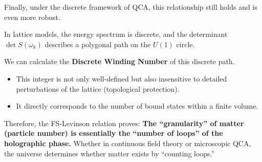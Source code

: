 Finally, under the discrete framework of QCA, this relationship still holds and is even more robust.

In lattice models, the energy spectrum is discrete, and the determinant $\det S(\omega_k)$ describes a polygonal path on the $U(1)$ circle.

We can calculate the \textbf{Discrete Winding Number} of this discrete path.

\begin{itemize}
\item This integer is not only well-defined but also insensitive to detailed perturbations of the lattice (topological protection).

\item It directly corresponds to the number of bound states within a finite volume.
\end{itemize}

Therefore, the FS-Levinson relation proves: \textbf{The ``granularity'' of matter (particle number) is essentially the ``number of loops'' of the holographic phase.} Whether in continuous field theory or microscopic QCA, the universe determines whether matter exists by ``counting loops.''

